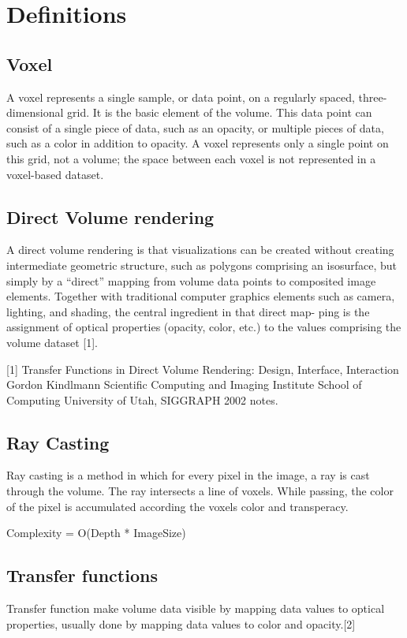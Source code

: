 \section{Definitions}

\subsection{Voxel}
A voxel represents a single sample, or data point, on a regularly spaced, three-dimensional grid.  It is the basic element of the volume. This data point can consist of a single piece of data, such as an opacity, or multiple pieces of data, such as a color in addition to opacity. A voxel represents only a single point on this grid, not a volume; the space between each voxel is not represented in a voxel-based dataset.

\subsection{Direct Volume rendering}
A direct volume rendering is that visualizations can be created without creating intermediate geometric structure, such
as polygons comprising an isosurface, but simply by a “direct” mapping from volume data points to composited image elements.
Together with traditional computer graphics elements such as camera, lighting, and shading, the central ingredient in that direct map-
ping is the assignment of optical properties (opacity, color, etc.) to the values comprising the volume dataset [1].

[1] Transfer Functions in Direct Volume Rendering: Design, Interface, Interaction Gordon Kindlmann Scientific Computing and Imaging Institute School of Computing University of Utah, SIGGRAPH 2002 notes. 

\subsection{Ray Casting}
Ray casting is a method in which for every pixel in the image, a ray is cast through the volume. The ray intersects a line of voxels.
While passing, the color of the pixel is accumulated according the voxels color and transperacy.

Complexity = O(Depth * ImageSize)

\subsection{Transfer functions}
Transfer function make volume data visible by mapping data values to optical properties, usually done by mapping data values to color and opacity.[2]

